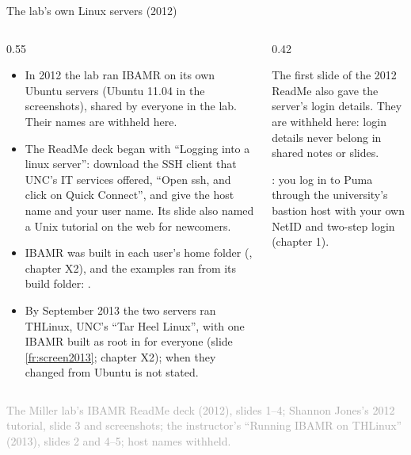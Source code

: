\documentclass[aspectratio=169,11pt]{beamer}
\newcommand{\sourcecredit}[1]{\vfill\begin{flushright}\tiny\textcolor{DarkGray}{#1}\end{flushright}}
\begin{document}
\begin{frame}{The lab's own Linux servers (2012)}
\label{fr:labservers}
\begin{columns}[T,onlytextwidth]
\begin{column}{0.55\textwidth}
\scriptsize
\begin{itemize}\setlength{\itemsep}{3pt}
  \item In 2012 the lab ran IBAMR on its own Ubuntu servers (Ubuntu 11.04 in the screenshots), shared by everyone in the lab. Their names are withheld here.
  \item The ReadMe deck began with ``Logging into a linux server'': download the SSH client that UNC's IT services offered, ``Open ssh, and click on Quick Connect'', and give the host name and your user name. Its slide also named a Unix tutorial on the web for newcomers.
  \item IBAMR was built in each user's home folder (, chapter X2), and the examples ran from its build folder: .
  \item By September 2013 the two servers ran THLinux, UNC's ``Tar Heel Linux'', with one IBAMR built as root in  for everyone (slide \ref{fr:screen2013}; chapter X2); when they changed from Ubuntu is not stated.
\end{itemize}
\end{column}
\begin{column}{0.42\textwidth}
\begin{homebox}
\footnotesize The first slide of the 2012 ReadMe also gave the server's login details. They are withheld here: login details never belong in shared notes or slides.
\end{homebox}
\vspace{2mm}
\footnotesize {}: you log in to Puma through the university's bastion host with your own NetID and two-step login (chapter 1).
\end{column}
\end{columns}
\sourcecredit{The Miller lab's IBAMR ReadMe deck (2012), slides 1--4; Shannon Jones's 2012 tutorial, slide 3 and screenshots; the instructor's ``Running IBAMR on THLinux'' (2013), slides 2 and 4--5; host names withheld.}
\end{frame}
\end{document}
